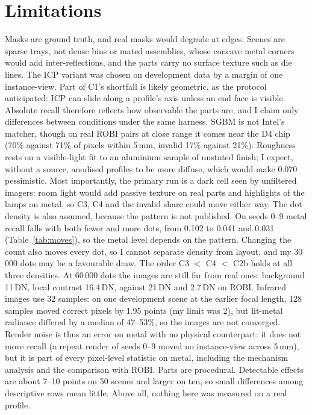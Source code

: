 \documentclass[10pt,a4paper]{article}
\begin{document}
\section{Limitations}
Masks are ground truth, and real masks would degrade at edges. Scenes are sparse trays, not dense bins or mated assemblies, whose concave metal corners would add inter-reflections, and the parts carry no surface texture such as die lines. The ICP variant was chosen on development data by a margin of one instance-view. Part of C1's shortfall is likely geometric, as the protocol anticipated: ICP can slide along a profile's axis unless an end face is visible. Absolute recall therefore reflects how observable the parts are, and I claim only differences between conditions under the same harness. SGBM is not Intel's matcher, though on real ROBI pairs at close range it comes near the D4 chip (70\% against 71\% of pixels within 5\,mm, invalid 17\% against 21\%). Roughness rests on a visible-light fit to an aluminium sample of unstated finish; I expect, without a source, anodised profiles to be more diffuse, which would make 0.070 pessimistic. Most importantly, the primary run is a dark cell seen by unfiltered imagers: room light would add passive texture on real parts and highlights of the lamps on metal, so C3, C4 and the invalid share could move either way. The dot density is also assumed, because the pattern is not published. On seeds 0--9 metal recall falls with both fewer and more dots, from 0.102 to 0.041 and 0.031 (Table~\ref{tab:moves}), so the metal level depends on the pattern. Changing the count also moves every dot, so I cannot separate density from layout, and my 30\,000 dots may be a favourable draw. The order C3 $<$ C4 $<$ C2b holds at all three densities. At 60\,000 dots the images are still far from real ones: background 11\,DN, local contrast 16.4\,DN, against 21\,DN and 2.7\,DN on ROBI. Infrared images use 32 samples: on one development scene at the earlier focal length, 128 samples moved correct pixels by 1.95 points (my limit was 2), but lit-metal radiance differed by a median of 47--53\%, so the images are not converged. Render noise is thus an error on metal with no physical counterpart: it does not move recall (a repeat render of seeds 0--9 moved no instance-view across 5\,mm), but it is part of every pixel-level statistic on metal, including the mechanism analysis and the comparison with ROBI. Parts are procedural. Detectable effects are about 7--10 points on 50 scenes and larger on ten, so small differences among descriptive rows mean little. Above all, nothing here was measured on a real profile.
\end{document}
